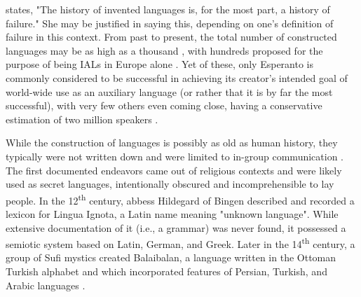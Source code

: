 \documentclass[12pt,a4paper]{article}
\numberwithin{figure}{section}
\numberwithin{table}{section}
\numberwithin{definition}{section}
\begin{document}

\textcite{okrent2009book} states, "The history of invented languages is, for the most part, a history of failure." She may be justified in saying this, depending on one's definition of failure in this context. From past to present, the total number of constructed languages may be as high as a thousand \parencite{Libert2016inbook,Schubert1989inbook,Schubert2001book}, with hundreds proposed for the purpose of being IALs in Europe alone \parencite{Schubert2001book}. Yet of these, only Esperanto is commonly considered to be successful in achieving its creator's intended goal of world-wide use as an auxiliary language (or rather that it is by far the most successful), with very few others even coming close, having a conservative estimation of two million speakers \parencite{okrent2009book}.

While the construction of languages is possibly as old as human history, they typically were not written down and were limited to in-group communication \parencite{Gobbo2016article}. The first documented endeavors came out of religious contexts and were likely used as secret languages, intentionally obscured and incomprehensible to lay people. In the 12\textsuperscript{th} century, abbess Hildegard of Bingen described and recorded a lexicon for Lingua Ignota, a Latin name meaning "unknown language". While extensive documentation of it (i.e., a grammar) was never found, it possessed a semiotic system based on Latin, German, and Greek. Later in the 14\textsuperscript{th} century, a group of Sufi mystics created Balaibalan, a language written in the Ottoman Turkish alphabet and which incorporated features of Persian, Turkish, and Arabic languages \parencite{Novikov2022article}.
\end{document}
